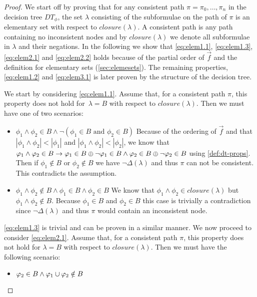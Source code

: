 \begin{proof}
We start off by proving that for any consistent path $\pi=\pi_0,\ldots,\pi_n$ in the decision tree $DT_\phi$, the set $\lambda$ consisting of the subformulae on the path of $\pi$ is an elementary set with respect to $closure(\lambda)$. A consistent path is any path containing no inconsistent nodes and by $closure(\lambda)$ we denote all subformulae in $\lambda$ and their negations. In the following we show that \autoref{eq:elem1.1}, \autoref{eq:elem1.3}, \autoref{eq:elem2.1} and \autoref{eq:elem2.2} holds because of the partial order of $\vec{f}$ and the definition for elementary sets (\autoref{sec:elemesets}). The remaining properties, \autoref{eq:elem1.2} and \autoref{eq:elem3.1} is later proven by the structure of the decision tree.

We start by considering \autoref{eq:elem1.1}. Assume that, for a consistent path $\pi$, this property does not hold for~$\lambda=B$ with respect to $closure(\lambda)$. Then we must have one of two scenarios:
\begin{itemize}
    \item $\phi_1 \land \phi_2 \in B \land \lnot(\phi_1 \in B \text{ and } \phi_2 \in B)$ \quad
    Because of the ordering of $\vec{f}$ and that $|\phi_1 \land \phi_2| < |\phi_1|$ and $|\phi_1 \land \phi_2| < |\phi_2|$, we know that $\varphi_1 \land \varphi_2 \in B \rightarrow \varphi_1 \in B \oplus \lnot\varphi_1 \in B \land \varphi_2 \in B \oplus \lnot\varphi_2 \in B$ using \autoref{def:dt-props}. Then if $\phi_1 \notin B$ or $\phi_2 \notin B$ we have $\lnot\Delta(\lambda)$ and thus $\pi$ can not be consistent. This contradicts the assumption.
    \item $\phi_1 \land \phi_2 \notin B \land \phi_1 \in B \land \phi_2 \in B$ \quad We know that $\phi_1 \land \phi_2 \in closure(\lambda)$ but $\phi_1 \land \phi_2 \notin B$. Because $\phi_1 \in B$ and $\phi_2 \in B$ this case is trivially a contradiction since $\lnot\Delta(\lambda)$ and thus $\pi$ would contain an inconsistent node.
\end{itemize}
\autoref{eq:elem1.3} is trivial and can be proven in a similar manner. We now proceed to consider \autoref{eq:elem2.1}. Assume that, for a consistent path $\pi$, this property does not hold for $\lambda=B$ with respect to $closure(\lambda)$. Then we must have the following scenario:
\begin{itemize}
    \item $\varphi_2 \in B \land \varphi_1 \cup \varphi_2 \notin B$ \quad

\end{itemize}
\end{proof}
